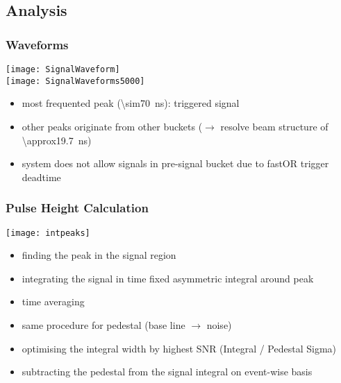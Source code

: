 \subsection{Analysis}
\begin{frame}
	\frametitle{Waveforms}
	\vspace*{-20pt}
	\begin{center}
		\texttt{[image: SignalWaveform]}\\
		\texttt{[image: SignalWaveforms5000]}
	\end{center}
	\begin{itemize}
		\item most frequented peak (\SI{\sim70}{ns}): triggered signal
		\item other peaks originate from other buckets ($\rightarrow$ resolve beam structure of \SI{\approx19.7}{ns})
		\item system does not allow signals in pre-signal bucket due to fastOR trigger deadtime
	\end{itemize}
\end{frame}
\begin{frame}
	\frametitle{Pulse Height Calculation}
	\vspace*{-5pt}
	\begin{center}
		\texttt{[image: intpeaks]}\\
	\end{center}
	\vspace*{-5pt}
	\begin{itemize}
		\setlength{\itemsep}{\fill}
		\item finding the peak in the signal region
		\item integrating the signal in time fixed asymmetric integral around peak
		\item time averaging
		\item same procedure for pedestal (base line $\rightarrow$ noise)
		\item optimising the integral width by highest SNR (Integral / Pedestal Sigma)
		\item subtracting the pedestal from the signal integral on event-wise basis 
	\end{itemize}
\end{frame}
